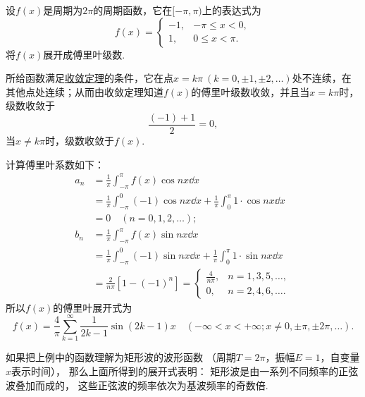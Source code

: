\begin{example}[矩形波的谐波分析]
设\(f(x)\)是周期为\(2\pi\)的周期函数，它在\([-\pi,\pi)\)上的表达式为\[
f(x) = \left\{ \begin{array}{cc}
-1, & -\pi \leq x < 0, \\
1, & 0 \leq x < \pi.
\end{array} \right.
\]将\(f(x)\)展开成傅里叶级数.
\begin{solution}
所给函数满足\hyperref[theorem:无穷级数.傅里叶级数收敛的狄利克雷充分条件]{收敛定理}的条件，它在点\(x = k\pi\ (k=0,\pm1,\pm2,\dotsc)\)处不连续，在其他点处连续；从而由收敛定理知道\(f(x)\)的傅里叶级数收敛，并且当\(x = k\pi\)时，级数收敛于\[
\frac{(-1)+1}{2} = 0,
\]当\(x \neq k\pi\)时，级数收敛于\(f(x)\).

计算傅里叶系数如下：
\begin{align*}
	a_n &= \frac{1}{\pi} \int_{-\pi}^{\pi} f(x) \cos nx \dd{x} \\
		&= \frac{1}{\pi} \int_{-\pi}^0 (-1) \cos nx \dd{x}
			+ \frac{1}{\pi} \int_0^{\pi} 1 \cdot \cos nx \dd{x} \\
		&= 0 \quad(n=0,1,2,\dotsc); \\
	b_n &= \frac{1}{\pi} \int_{-\pi}^{\pi} f(x) \sin nx \dd{x} \\
		&= \frac{1}{\pi} \int_{-\pi}^0 (-1) \sin nx \dd{x}
			+ \frac{1}{\pi} \int_0^{\pi} 1 \cdot \sin nx \dd{x} \\
		&= \frac{2}{n\pi} [1-(-1)^n]
		= \left\{ \begin{array}{cl}
			\frac{4}{n\pi}, & n=1,3,5,\dotsc, \\
			0, & n=2,4,6,\dotsc.
		\end{array} \right.
\end{align*}
所以\(f(x)\)的傅里叶展开式为\[
	f(x) = \frac{4}{\pi} \sum\limits_{k=1}^\infty \frac{1}{2k-1} \sin(2k-1) x
	\quad(-\infty<x<+\infty;x\neq0,\pm\pi,\pm2\pi,\dotsc).
\]
\end{solution}
\end{example}
如果把上例中的函数理解为矩形波的波形函数%
（周期\(T=2\pi\)，振幅\(E=1\)，自变量\(x\)表示时间），
那么上面所得到的展开式表明：
矩形波是由一系列不同频率的正弦波叠加而成的，
这些正弦波的频率依次为基波频率的奇数倍.

